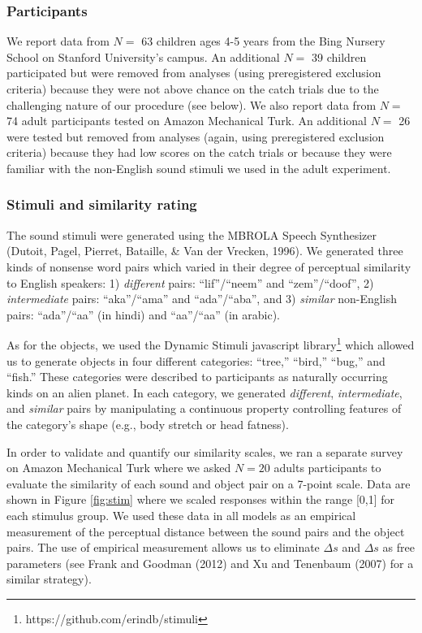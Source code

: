 \documentclass[english,,man,floatsintext]{apa6}
\let\rmarkdownfootnote\footnote%
\def\footnote{\protect\rmarkdownfootnote}
\theoremstyle{definition}
\theoremstyle{definition}
\theoremstyle{definition}
\theoremstyle{remark}
\begin{document}
\subsubsection{Participants}\label{participants}

We report data from \(N=\) 63 children ages 4-5 years from the Bing
Nursery School on Stanford University's campus. An additional \(N=\) 39
children participated but were removed from analyses (using
preregistered exclusion criteria) because they were not above chance on
the catch trials due to the challenging nature of our procedure (see
below). We also report data from \(N=\) 74 adult participants tested on
Amazon Mechanical Turk. An additional \(N=\) 26 were tested but removed
from analyses (again, using preregistered exclusion criteria) because
they had low scores on the catch trials or because they were familiar
with the non-English sound stimuli we used in the adult experiment.

\subsubsection{Stimuli and similarity
rating}\label{stimuli-and-similarity-rating}

The sound stimuli were generated using the MBROLA Speech Synthesizer
(Dutoit, Pagel, Pierret, Bataille, \& Van der Vrecken, 1996). We
generated three kinds of nonsense word pairs which varied in their
degree of perceptual similarity to English speakers: 1) \emph{different}
pairs: \enquote{lif}/\enquote{neem} and \enquote{zem}/\enquote{doof}, 2)
\emph{intermediate} pairs: \enquote{aka}/\enquote{ama} and
\enquote{ada}/\enquote{aba}, and 3) \emph{similar} non-English pairs:
\enquote{ada}/\enquote{aa} (in hindi) and
\enquote{aa}/\enquote{a\textipa{\textcrh}a} (in arabic).

As for the objects, we used the Dynamic Stimuli javascript
library\footnote{https://github.com/erindb/stimuli} which allowed us to
generate objects in four different categories: \enquote{tree,}
\enquote{bird,} \enquote{bug,} and \enquote{fish.} These categories were
described to participants as naturally occurring kinds on an alien
planet. In each category, we generated \emph{different},
\emph{intermediate}, and \emph{similar} pairs by manipulating a
continuous property controlling features of the category's shape (e.g.,
body stretch or head fatness).

In order to validate and quantify our similarity scales, we ran a
separate survey on Amazon Mechanical Turk where we asked \(N=20\) adults
participants to evaluate the similarity of each sound and object pair on
a 7-point scale. Data are shown in Figure \ref{fig:stim} where we scaled
responses within the range {[}0,1{]} for each stimulus group. We used
these data in all models as an empirical measurement of the perceptual
distance between the sound pairs and the object pairs. The use of
empirical measurement allows us to eliminate \(\Delta s\) and
\(\Delta s\) as free parameters (see Frank and Goodman (2012) and Xu and
Tenenbaum (2007) for a similar strategy).
\end{document}
